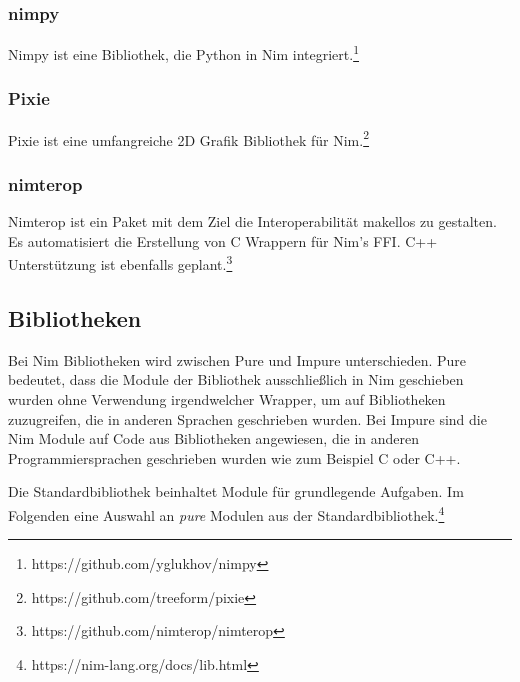 \documentclass[11pt]{report}
\begin{document}
\subsubsection{nimpy}
Nimpy ist eine Bibliothek, die Python in Nim integriert.\footnote{https://github.com/yglukhov/nimpy}

\subsubsection{Pixie}
Pixie ist eine umfangreiche 2D Grafik Bibliothek für Nim.\footnote{https://github.com/treeform/pixie}

\subsubsection{nimterop}
Nimterop ist ein Paket mit dem Ziel die Interoperabilität makellos zu gestalten. Es automatisiert die Erstellung von C Wrappern für Nim's FFI.
C++ Unterstützung ist ebenfalls geplant.\footnote{https://github.com/nimterop/nimterop}

\subsection{Bibliotheken}
Bei Nim Bibliotheken wird zwischen Pure und Impure unterschieden.
Pure bedeutet, dass die Module der Bibliothek ausschließlich in Nim geschieben wurden ohne Verwendung irgendwelcher Wrapper, um auf Bibliotheken zuzugreifen, die in anderen Sprachen geschrieben wurden.
Bei Impure sind die Nim Module auf Code aus Bibliotheken angewiesen, die in anderen Programmiersprachen geschrieben wurden wie zum Beispiel C oder C++.

Die Standardbibliothek beinhaltet Module für grundlegende Aufgaben. Im Folgenden eine Auswahl an \emph{pure} Modulen aus der Standardbibliothek.\footnote{https://nim-lang.org/docs/lib.html}
\end{document}
